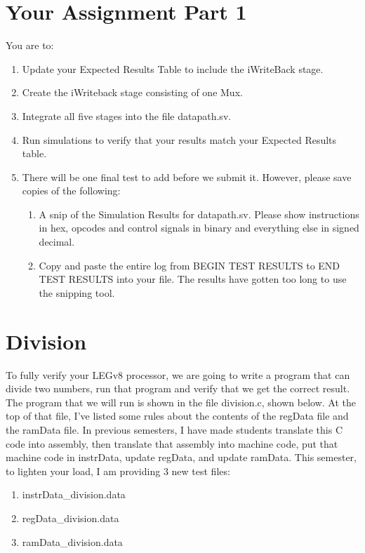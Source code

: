 \section{Your Assignment Part 1}

You are to:
\begin{enumerate}
\item Update your Expected Results Table to include the iWriteBack stage.
\item Create the iWriteback stage consisting of one Mux.
\item Integrate all five stages into the file datapath.sv.
\item Run simulations to verify that your results match your Expected Results table.   
\item There will be one final test to add before we submit it.  However, please save copies of the following:
\begin{enumerate}
	\item A snip of the Simulation Results for datapath.sv.  Please show instructions in hex, opcodes and control signals in binary and everything else in signed decimal.  
	\item Copy and paste the entire log from BEGIN TEST RESULTS to END TEST RESULTS into your file.  The results have gotten too long to use the snipping tool.
\end{enumerate} 
\end{enumerate} 

\section{Division}
To fully verify your LEGv8 processor, we are going to write a program that can divide two numbers, run that program and verify that we get the correct result.  The program that we will run is shown in the file division.c, shown below.  At the top of that file, I've listed some rules about the contents of the regData file and the ramData file.  In previous semesters, I have made students translate this C code into assembly, then translate that assembly into machine code, put that machine code in instrData, update regData, and update ramData.  This semester, to lighten your load, I am providing 3 new test files:
\begin{enumerate}
	\item instrData\_division.data
	\item regData\_division.data
	\item ramData\_division.data
\end{enumerate}

